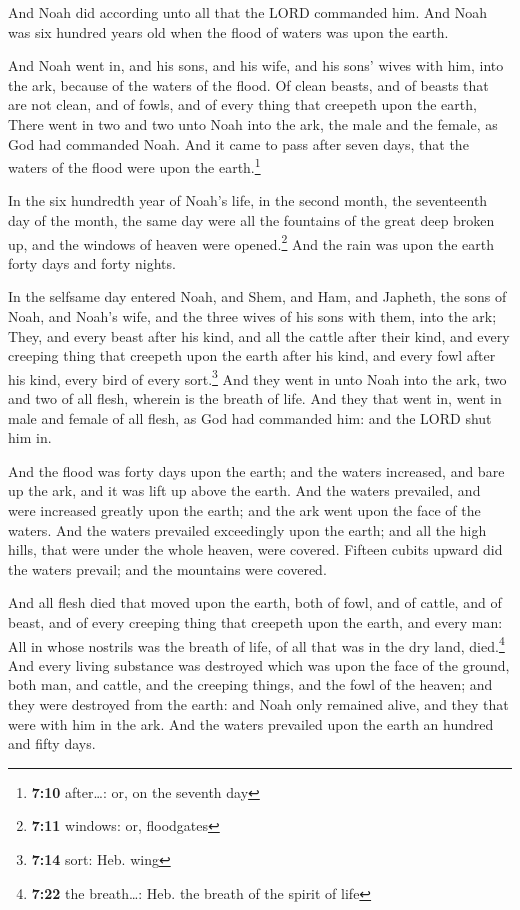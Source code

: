  And Noah did according unto all that the LORD commanded
him.  And Noah was six hundred years old when the flood of
waters was upon the earth.

 And Noah went in, and his sons, and his wife, and his
sons' wives with him, into the ark, because of the waters of the flood.
 Of clean beasts, and of beasts that are not clean, and of
fowls, and of every thing that creepeth upon the earth, 
There went in two and two unto Noah into the ark, the male and the
female, as God had commanded Noah.  And it came to pass
after seven days, that the waters of the flood were upon the
earth.\footnote{\textbf{7:10} after\ldots: or, on the seventh day}

 In the six hundredth year of Noah's life, in the second
month, the seventeenth day of the month, the same day were all the
fountains of the great deep broken up, and the windows of heaven were
opened.\footnote{\textbf{7:11} windows: or, floodgates} 
And the rain was upon the earth forty days and forty nights.

 In the selfsame day entered Noah, and Shem, and Ham, and
Japheth, the sons of Noah, and Noah's wife, and the three wives of his
sons with them, into the ark;  They, and every beast
after his kind, and all the cattle after their kind, and every creeping
thing that creepeth upon the earth after his kind, and every fowl after
his kind, every bird of every sort.\footnote{\textbf{7:14} sort: Heb.
  wing}  And they went in unto Noah into the ark, two and
two of all flesh, wherein is the breath of life.  And
they that went in, went in male and female of all flesh, as God had
commanded him: and the LORD shut him in.

 And the flood was forty days upon the earth; and the
waters increased, and bare up the ark, and it was lift up above the
earth.  And the waters prevailed, and were increased
greatly upon the earth; and the ark went upon the face of the waters.
 And the waters prevailed exceedingly upon the earth; and
all the high hills, that were under the whole heaven, were covered.
 Fifteen cubits upward did the waters prevail; and the
mountains were covered.

 And all flesh died that moved upon the earth, both of
fowl, and of cattle, and of beast, and of every creeping thing that
creepeth upon the earth, and every man:  All in whose
nostrils was the breath of life, of all that was in the dry land,
died.\footnote{\textbf{7:22} the breath\ldots: Heb. the breath of the
  spirit of life}  And every living substance was
destroyed which was upon the face of the ground, both man, and cattle,
and the creeping things, and the fowl of the heaven; and they were
destroyed from the earth: and Noah only remained alive, and they that
were with him in the ark.  And the waters prevailed upon
the earth an hundred and fifty days.

